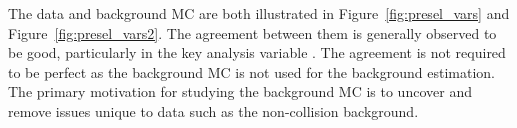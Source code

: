 The data and background MC are both illustrated in Figure~\ref{fig:presel_vars} and Figure~\ref{fig:presel_vars2}. The agreement between them is generally observed to be good, particularly in the key analysis variable \mt. The agreement is not required to be perfect as the background MC is not used for the background estimation. The primary motivation for studying the background MC is to uncover and remove issues unique to data such as the non-collision background.

 \clearpage
%





